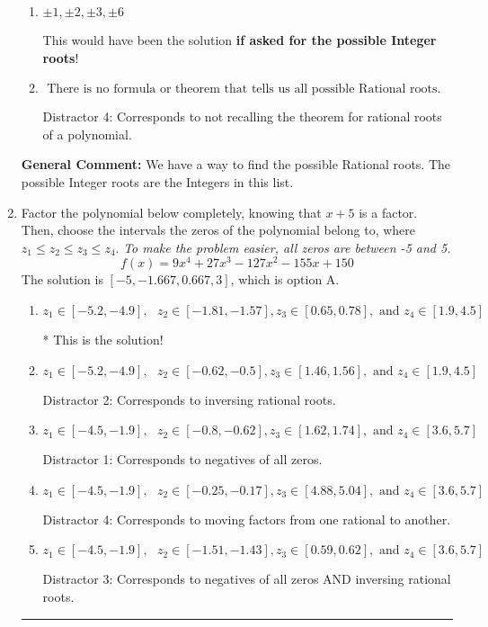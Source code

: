 \documentclass{extbook}[14pt]
\newcommand{\litem}[1]{\item #1

\rule{\textwidth}{0.4pt}}
\begin{document}
\begin{enumerate}
{\begin{enumerate}[label=\Alph*.]
 Distractor 1: Corresponds to the plus or minus factors of a1 only.
\item \( \pm 1,\pm 2,\pm 3,\pm 6 \)

This would have been the solution \textbf{if asked for the possible Integer roots}!
\item \( \text{ There is no formula or theorem that tells us all possible Rational roots.} \)

 Distractor 4: Corresponds to not recalling the theorem for rational roots of a polynomial.
\end{enumerate}

\textbf{General Comment:} We have a way to find the possible Rational roots. The possible Integer roots are the Integers in this list.
}
\litem{
Factor the polynomial below completely, knowing that $x + 5$ is a factor. Then, choose the intervals the zeros of the polynomial belong to, where $z_1 \leq z_2 \leq z_3 \leq z_4$. \textit{To make the problem easier, all zeros are between -5 and 5.}
\[ f(x) = 9x^{4} +27 x^{3} -127 x^{2} -155 x + 150 \]The solution is \( [-5, -1.667, 0.667, 3] \), which is option A.\begin{enumerate}[label=\Alph*.]
\item \( z_1 \in [-5.2, -4.9], \text{   }  z_2 \in [-1.81, -1.57], z_3 \in [0.65, 0.78], \text{   and   } z_4 \in [1.9, 4.5] \)

* This is the solution!
\item \( z_1 \in [-5.2, -4.9], \text{   }  z_2 \in [-0.62, -0.5], z_3 \in [1.46, 1.56], \text{   and   } z_4 \in [1.9, 4.5] \)

 Distractor 2: Corresponds to inversing rational roots.
\item \( z_1 \in [-4.5, -1.9], \text{   }  z_2 \in [-0.8, -0.62], z_3 \in [1.62, 1.74], \text{   and   } z_4 \in [3.6, 5.7] \)

 Distractor 1: Corresponds to negatives of all zeros.
\item \( z_1 \in [-4.5, -1.9], \text{   }  z_2 \in [-0.25, -0.17], z_3 \in [4.88, 5.04], \text{   and   } z_4 \in [3.6, 5.7] \)

 Distractor 4: Corresponds to moving factors from one rational to another.
\item \( z_1 \in [-4.5, -1.9], \text{   }  z_2 \in [-1.51, -1.43], z_3 \in [0.59, 0.62], \text{   and   } z_4 \in [3.6, 5.7] \)

 Distractor 3: Corresponds to negatives of all zeros AND inversing rational roots.
\end{enumerate}

}
\end{enumerate}
\end{document}
